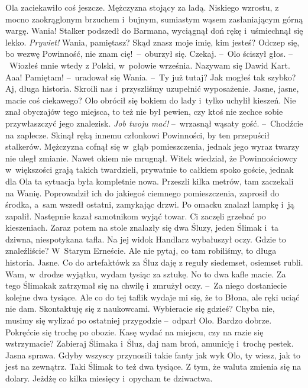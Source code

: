 \documentclass[../MAIN.tex]{subfiles}
\begin{document}
\pp
Ola zaciekawiło coś jeszcze. Mężczyzna stojący za ladą. Niskiego wzrostu, z mocno zaokrąglonym brzuchem i~bujnym, sumiastym wąsem zasłaniającym górną wargę. Wania! Stalker podszedł do Barmana, wyciągnął doń rękę i~uśmiechnął się lekko.
\sx \textit{Prywiet!} Wania, pamiętasz?
\xx Skąd znasz moje imię, kim jesteś? Odczep się, bo wezwę Powinność, nie znam cię!~--~oburzył się.
\xx Czekaj. --~Olo ściszył głos. --~Wiozłeś mnie wtedy z Polski, w~połowie września. Nazywam się Dawid Kart.
\xx Aaa! Pamiętam! --~uradował się Wania. --~Ty już tutaj? Jak mogłeś tak szybko?
\xx Aj, długa historia. Skroili nas i~przyszliśmy uzupełnić wyposażenie.
\xx Jasne, jasne, macie coś ciekawego?
\qd
\hspace{16.4em} Olo obrócił się bokiem do lady i~tylko uchylił kieszeń. Nie znał obyczajów tego miejsca, to też nie był pewien, czy ktoś nie zechce sobie przywłaszczyć jego znalezisk.
\sd
\xx \textit{Job twoju mać!} --~wrzasnął wąsaty gość. --~Chodźcie na zaplecze.
\qd
\hspace{30em}Skinął ręką innemu członkowi Powinności, by ten przepuścił stalkerów. Mężczyzna cofnął się w~głąb pomieszczenia, jednak jego wyraz twarzy nie uległ zmianie. Nawet okiem nie mrugnął. Witek wiedział, że Powinnościowcy w~większości grają takich twardzieli, prywatnie to całkiem spoko goście, jednak dla Ola ta sytuacja była kompletnie nowa.
\pp
Przeszli kilka metrów, tam zaczekali na Wanię. Poprowadził ich do jakiegoś ciemnego pomieszczenia, zaprosił do środka, a~sam wszedł ostatni, zamykając drzwi. Po omacku znalazł lampkę i~ją zapalił. Następnie kazał samotnikom wyjąć towar. Ci zaczęli grzebać po kieszeniach. Zaraz potem na stole znalazły się dwa Śluzy, jeden Ślimak i~ta dziwna, niespotykana tafla. Na jej widok Handlarz wybałuszył oczy.
\sx Gdzie to znaleźliście?
\xx W~Starym Erneście. Ale nie pytaj, co tam robiliśmy, to długa historia.
\xx Jasne. Co do artefaktów\3k za Śluz daję z reguły siedemset, osiemset rubli. Wam, w~drodze wyjątku, wydam tysiąc za sztukę. No to dwa kafle macie. Za tego Ślimaka\3k \xx zatrzymał się na chwilę i~zmrużył oczy. --~Za niego dostaniecie kolejne dwa tysiące. Ale co do tej tafli\3k wydaje mi się, że to Błona, ale ręki uciąć nie dam. Skontaktuję się z naukowcami. Wybieracie się gdzieś?
\xx Chyba nie, musimy się wylizać po ostatniej przygodzie --~odparł Olo.
\xx Bardzo dobrze. Pokręćcie się trochę po obozie. Kasę wydać na miejscu, czy na razie się wstrzymacie?
\xx Zabieraj Ślimaka i~Śluz, daj nam broń, amunicję i~trochę pestek.
\xx Jasna sprawa. Gdyby wszyscy przynosili takie fanty jak wy\3k Olo, ty wiesz, jak to jest na zewnątrz. Taki Ślimak to też dwa tysiące. Z tym, że waluta zmienia się na dolary. Jeżdżę co kilka miesięcy i~opycham te dziwactwa.
\end{document}
